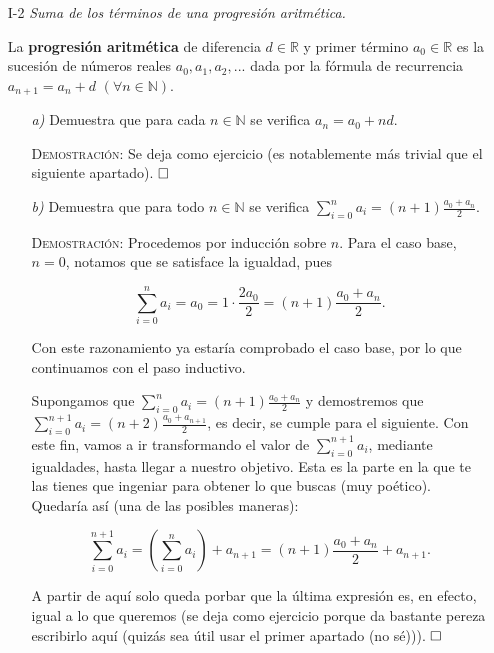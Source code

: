 \documentclass{article}
\begin{document}
\begin{itemize}
    \item[I-2] \textit{Suma de los términos de una progresión aritmética.}

    La \textbf{progresión aritmética} de diferencia $d \in \mathbb{R}$ y primer término $a_0 \in \mathbb{R}$ es la sucesión de números reales $a_0, a_1, a_2, ...$ dada por la fórmula de recurrencia $a_{n + 1} = a_n + d$ $(\forall n \in \mathbb{N})$.

    \begin{itemize}
        \item[\textit{a)}] Demuestra que para cada $n \in \mathbb{N}$ se verifica $a_n = a_0 + nd$.

        \textsc{Demostración:} Se deja como ejercicio (es notablemente más trivial que el siguiente apartado). $\hfill\square$ \\

        \item[\textit{b)}] Demuestra que para todo $n \in \mathbb{N}$ se verifica $\sum_{i = 0}^{n} a_i = (n + 1)\frac{a_0 + a_n}{2}$.

        \textsc{Demostración:} Procedemos por inducción sobre $n$. Para el caso base, $n = 0$, notamos que se satisface la igualdad, pues

        \[\sum_{i = 0}^{n} a_i = a_0 = 1 \cdot \frac{2a_0}{2} = (n + 1)\frac{a_0 + a_n}{2}.\]

        Con este razonamiento ya estaría comprobado el caso base, por lo que continuamos con el paso inductivo. 
        
        Supongamos que $\sum_{i = 0}^{n} a_i = (n + 1)\frac{a_0 + a_n}{2}$ y demostremos que $\sum_{i = 0}^{n + 1} a_i = (n + 2)\frac{a_0 + a_{n + 1}}{2}$, es decir, se cumple para el siguiente. Con este fin, vamos a ir transformando el valor de $\sum_{i = 0}^{n + 1} a_i$, mediante igualdades, hasta llegar a nuestro objetivo. Esta es la parte en la que te las tienes que ingeniar para obtener lo que buscas (muy poético). Quedaría así (una de las posibles maneras):

        \[\sum_{i = 0}^{n + 1} a_i = \left(\sum_{i = 0}^{n} a_i\right) + a_{n + 1} = (n + 1)\frac{a_0 + a_n}{2} + a_{n + 1}.\]

        A partir de aquí solo queda porbar que la última expresión es, en efecto, igual a lo que queremos (se deja como ejercicio porque da bastante pereza escribirlo aquí (quizás sea útil usar el primer apartado (no sé))). $\hfill\square$
    \end{itemize}
\end{itemize}
\end{document}
